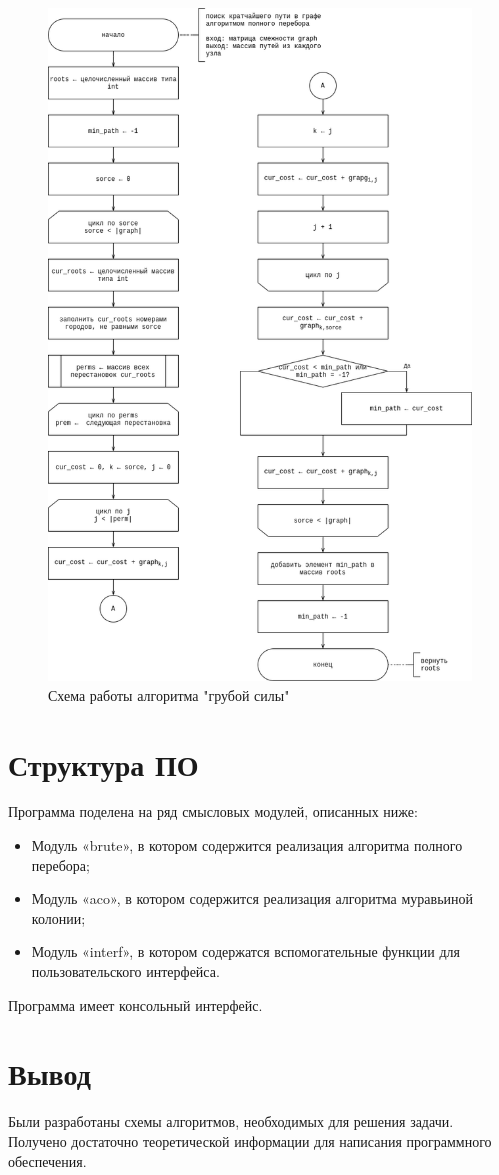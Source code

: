 \begin{center}
    \begin{figure}[!h]
        \centering
        \includegraphics[width=0.87\linewidth]{img/tsp-brute.drawio.png}
        \caption{Схема работы алгоритма "грубой силы"}
        \label{fig:brute}
    \end{figure}
\end{center}
\newpage
\text{   }
        

    \section{Структура ПО}
    \par Программа поделена на ряд смысловых модулей, описанных ниже:
    \begin{itemize}
        \item Модуль «brute», в котором содержится реализация алгоритма полного перебора;

        \item Модуль «aco», в котором содержится реализация алгоритма муравьиной колонии;

        \item Модуль «interf», в котором содержатся вспомогательные функции для пользовательского интерфейса.
    \end{itemize}

    Программа имеет консольный интерфейс.

	\section*{Вывод}
    \par Были разработаны схемы алгоритмов, необходимых для решения задачи. Получено достаточно теоретической информации для написания программного обеспечения.
\newpage